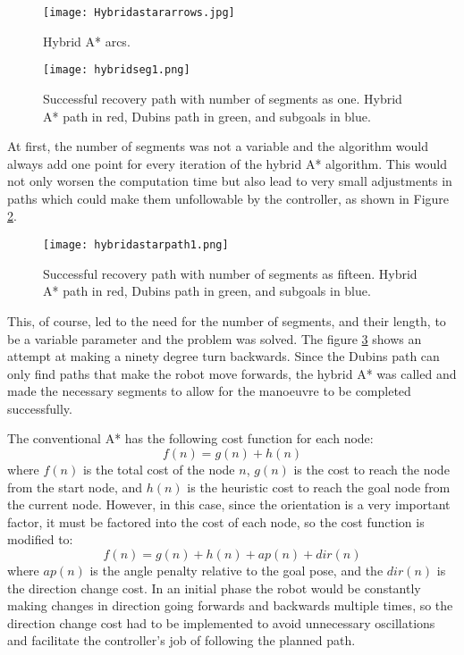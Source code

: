 \begin{figure}[h]
    \centering
    \texttt{[image: Hybridastararrows.jpg]}
    \caption{Hybrid A* arcs.}
    \label{fig:arrows}
\end{figure}

\begin{figure}[h]
    \centering
    \texttt{[image: hybridseg1.png]}
    \caption{Successful recovery path with number of segments as one. Hybrid A* path in red, Dubins path in green, and subgoals in blue.}
    \label{fig:rseg1}
\end{figure}

At first, the number of segments was not a variable and the algorithm would always add 
one point for every iteration of the hybrid A* algorithm. This would not only worsen the computation 
time but also lead to very small adjustments in paths which could make them unfollowable by the controller, 
as shown in Figure \ref{fig:rseg1}.



\begin{figure}[h]
    \centering
    \texttt{[image: hybridastarpath1.png]}
    \caption{Successful recovery path with number of segments as fifteen. Hybrid A* path in red, Dubins path in green, and subgoals in blue.}
    \label{fig:recovery_module}
\end{figure}

This, of course, led to the need for the number of segments, and their length, to be a variable 
parameter and the problem was solved. The figure \ref{fig:recovery_module} shows an attempt at 
making a ninety degree turn backwards. Since the Dubins path can only find paths that make the robot move 
forwards, the hybrid A* was called and made the necessary segments to allow for the manoeuvre 
to be completed successfully.

The conventional A* has the following cost function for each node:
$$f(n) = g(n) + h(n)$$
where $f(n)$ is the total cost of the node $n$, $g(n)$ is the cost to reach the node from the start node, 
and $h(n)$ is the heuristic cost to reach the goal node from the current node. However, 
in this case, since the orientation is a very important factor, it must be factored 
into the cost of each node, so the cost function is modified to:
$$f(n) = g(n) + h(n) + ap(n) + dir(n)$$
where $ap(n)$ is the angle penalty relative to the goal pose, and the $dir(n)$ 
is the direction change cost. In an initial phase the robot would be constantly making 
changes in direction going forwards and backwards multiple times, so the direction 
change cost had to be implemented to avoid unnecessary oscillations and facilitate  
the controller's job of following the planned path.

